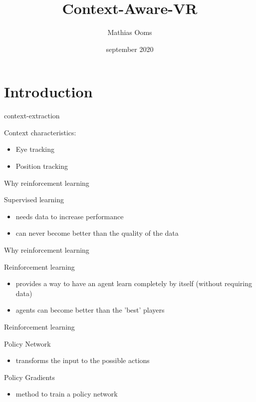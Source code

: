 \documentclass{beamer}
\title[Your Short Title]{Context-Aware-VR}
\author{Mathias Ooms}
\institute{University of Antwerp}
\date{september 2020}
\begin{document}
\begin{frame}
  \titlepage
\end{frame}


\section{Introduction}

\begin{frame}{context-extraction}


Context characteristics: 

\begin{itemize}
	\item Eye tracking
	\item Position tracking
\end{itemize}

\end{frame}


\begin{frame}{Why reinforcement learning}


Supervised learning 

\begin{itemize}
	\item needs data to increase performance
	\item can never become better than the quality of the data
\end{itemize}

\end{frame}


\begin{frame}{Why reinforcement learning}

Reinforcement learning 

\begin{itemize}
	\item provides a way to have an agent learn completely by itself (without requiring data) 
	\item agents can become better than the 'best' players
\end{itemize}

\end{frame}


\begin{frame}{Reinforcement learning}

Policy Network
\begin{itemize}
	\item transforms the input to the possible actions 
\end{itemize}

Policy Gradients
\begin{itemize}
	\item method to train a policy network
\end{itemize}

\end{frame}
\end{document}
